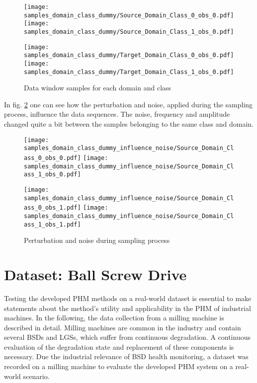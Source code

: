 \begin{figure}[H]
  \centering
  \texttt{[image: samples\_domain\_class\_dummy/Source\_Domain\_Class\_0\_obs\_0.pdf]}
  \hspace{.3cm}
  \texttt{[image: samples\_domain\_class\_dummy/Source\_Domain\_Class\_1\_obs\_0.pdf]}

  \vspace{.3cm}

  \texttt{[image: samples\_domain\_class\_dummy/Target\_Domain\_Class\_0\_obs\_0.pdf]}
  \hspace{.3cm}
  \texttt{[image: samples\_domain\_class\_dummy/Target\_Domain\_Class\_1\_obs\_0.pdf]}

  \caption{Data window samples for each domain and class}
  \label{fig:samples_domain_class_dummy}
\end{figure}

In fig. \ref{fig:samples_domain_class_dummy_influence_noise} one can see how the perturbation and noise, applied during the sampling process, influence the data sequences. The noise, frequency and amplitude changed quite a bit between the samples belonging to the same class and domain.

\begin{figure}[H]
  \centering
  \texttt{[image: samples\_domain\_class\_dummy\_influence\_noise/Source\_Domain\_Class\_0\_obs\_0.pdf]}
  \hspace{.3cm}
  \texttt{[image: samples\_domain\_class\_dummy\_influence\_noise/Source\_Domain\_Class\_1\_obs\_0.pdf]}

  \vspace{.3cm}

  \texttt{[image: samples\_domain\_class\_dummy\_influence\_noise/Source\_Domain\_Class\_0\_obs\_1.pdf]}
  \hspace{.3cm}
  \texttt{[image: samples\_domain\_class\_dummy\_influence\_noise/Source\_Domain\_Class\_1\_obs\_1.pdf]}

  \caption{Perturbation and noise during sampling process}
  \label{fig:samples_domain_class_dummy_influence_noise}
\end{figure}

\section{Dataset: Ball Screw Drive}
Testing the developed PHM methods on a real-world dataset is essential to make statements about the method's utility and applicability in the PHM of industrial machines. In the following, the data collection from a milling machine is described in detail. Milling machines are common in the industry and contain several BSDs and LGSs, which suffer from continuous degradation. A continuous evaluation of the degradation state and replacement of these components is necessary. Due the industrial relevance of BSD health monitoring, a dataset was recorded on a milling machine to evaluate the developed PHM system on a real-world scenario.

